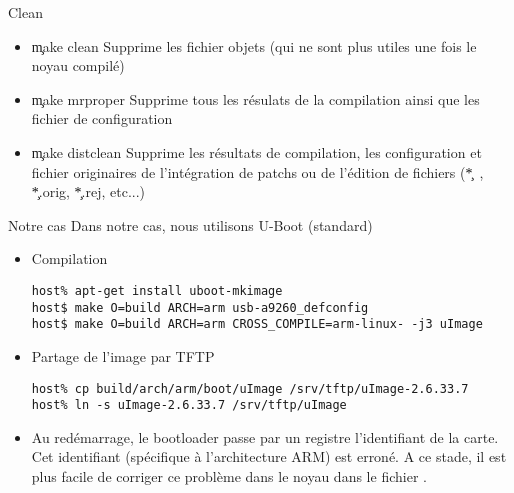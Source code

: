 \begin{frame}[fragile=singleslide]{Clean}
  \begin{itemize}
  \item \c{make clean}  Supprime les fichier objets (qui  ne sont plus
    utiles une fois le noyau compilé)
  \item \c{make mrproper} Supprime tous les résulats de la compilation
    ainsi que les fichier de configuration
  \item \c{make distclean} Supprime  les résultats de compilation, les
    configuration et fichier originaires de l'intégration de patchs ou
    de l'édition de fichiers (\c{*~}, \c{*.orig}, \c{*.rej}, etc...)
  \end{itemize} 
\end{frame} 

\begin{frame}[fragile=singleslide]{Notre cas}
  Dans notre cas, nous utilisons U-Boot (standard)
  \begin{itemize}
  \item Compilation
    \begin{lstlisting}
host% apt-get install uboot-mkimage
host$ make O=build ARCH=arm usb-a9260_defconfig
host$ make O=build ARCH=arm CROSS_COMPILE=arm-linux- -j3 uImage
    \end{lstlisting}
  \item Partage de l'image par TFTP
    \begin{lstlisting}
host% cp build/arch/arm/boot/uImage /srv/tftp/uImage-2.6.33.7
host% ln -s uImage-2.6.33.7 /srv/tftp/uImage
    \end{lstlisting} %
  \item  Au   redémarrage,  le   bootloader  passe  par   un  registre
    l'identifiant  de   la  carte.   Cet   identifiant  (spécifique  à
    l'architecture ARM) est erroné. A  ce stade, il est plus facile de
    corriger   ce   problème   dans   le   noyau   dans   le   fichier
    .
  \end{itemize}
\end{frame}

